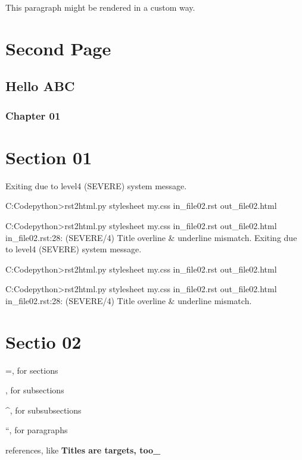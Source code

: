 \documentclass[letterpaper,10pt,english]{sphinxmanual}
\begin{document}
This paragraph might be rendered in a custom way.


\chapter{Second Page}
\label{\detokenize{in_file02:second-page}}\label{\detokenize{in_file02::doc}}

\section{Hello ABC}
\label{\detokenize{in_file02:hello-abc}}

\subsection{Chapter 01}
\label{\detokenize{in_file02:chapter-01}}

\chapter{Section 01}
\label{\detokenize{in_file02:section-01}}
Exiting due to level\sphinxhyphen{}4 (SEVERE) system message.

C:Codepython\textgreater{}rst2html.py  \textendash{}stylesheet my.css    in\_file02.rst  out\_file02.html

C:Codepython\textgreater{}rst2html.py  \textendash{}stylesheet my.css    in\_file02.rst  out\_file02.html
in\_file02.rst:28: (SEVERE/4) Title overline \& underline mismatch.
Exiting due to level\sphinxhyphen{}4 (SEVERE) system message.

C:Codepython\textgreater{}rst2html.py  \textendash{}stylesheet my.css    in\_file02.rst  out\_file02.html

C:Codepython\textgreater{}rst2html.py  \textendash{}stylesheet my.css    in\_file02.rst  out\_file02.html
in\_file02.rst:28: (SEVERE/4) Title overline \& underline mismatch.


\chapter{Sectio 02}
\label{\detokenize{in_file02:sectio-02}}
=, for sections

\sphinxhyphen{}, for subsections

\textasciicircum{}, for subsubsections

“, for paragraphs

 references, like {\color{red}\bfseries{}\textasciigrave{}Titles are targets, too\textasciigrave{}\_}
\end{document}
